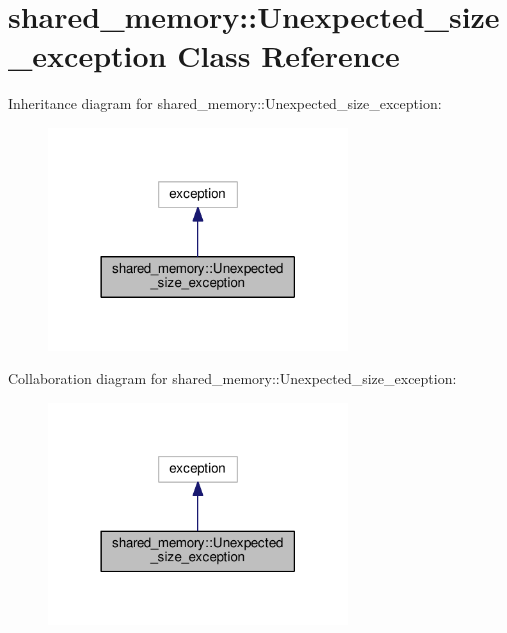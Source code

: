 \hypertarget{classshared__memory_1_1Unexpected__size__exception}{}\section{shared\+\_\+memory\+:\+:Unexpected\+\_\+size\+\_\+exception Class Reference}
\label{classshared__memory_1_1Unexpected__size__exception}


Inheritance diagram for shared\+\_\+memory\+:\+:Unexpected\+\_\+size\+\_\+exception\+:
\nopagebreak
\begin{figure}[H]
\begin{center}
\leavevmode
\includegraphics[width=225pt]{classshared__memory_1_1Unexpected__size__exception__inherit__graph}
\end{center}
\end{figure}


Collaboration diagram for shared\+\_\+memory\+:\+:Unexpected\+\_\+size\+\_\+exception\+:
\nopagebreak
\begin{figure}[H]
\begin{center}
\leavevmode
\includegraphics[width=225pt]{classshared__memory_1_1Unexpected__size__exception__coll__graph}
\end{center}
\end{figure}
